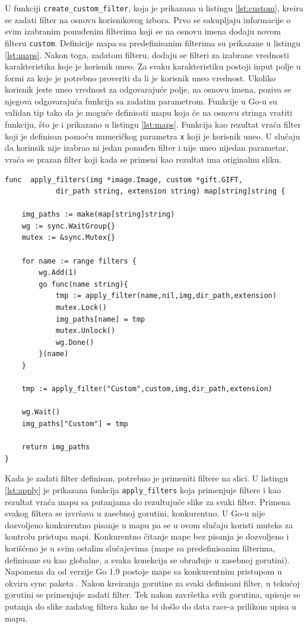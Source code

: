 \documentclass[12pt,oneside]{memoir}
\begin{document}
 U funkciji  \texttt{create\_custom\_filter}, koja je prikazana u listingu \ref{lst:custom}, kreira se zadati filter na osnovu korisnikovog izbora. Prvo se sakupljaju informacije o svim izabranim ponuđenim filterima koji se na osnovu imena dodaju novom filteru  \texttt{custom}. Definicije mapa sa predefinisanim filterima su prikazane u listingu \ref{lst:maps}. Nakon toga, zadatom filteru, dodaju se filteri za izabrane vrednosti karakteristika koje je korisnik uneo. Za svaku karakteristiku postoji input polje u formi za koje je potrebno proveriti da li je korisnik uneo vrednost. Ukoliko korisnik jeste uneo vrednost za odgovarajuće polje, na osnovu imena, poziva se njegova odgovarajuća funkcija sa zadatim parametrom. Funkcije u Go-u su validan tip tako da je moguće definisati mapu koja će na osnovu stringa vratiti funkciju, što je i prikazano u listingu \ref{lst:maps}. Funkcija kao rezultat vraća filter koji je definisan pomoću numeričkog parametra  \texttt{x} koji je korisnik uneo. U slučaju da korinsik nije izabrao ni jedan ponuđen filter i nije uneo nijedan parametar, vraća se prazan filter koji kada se primeni kao rezultat ima originalnu sliku.

\begin{center}
\begin{lstlisting}[caption=Funkcija za paralelnu primenu filtera,label={lst:apply},  backgroundcolor=\color{background}]
func  apply_filters(img *image.Image, custom *gift.GIFT, 
			dir_path string, extension string) map[string]string {

	img_paths := make(map[string]string)
	wg := sync.WaitGroup{}
	mutex := &sync.Mutex{}

	for name := range filters {
		wg.Add(1)
		go func(name string){
			tmp := apply_filter(name,nil,img,dir_path,extension)
			mutex.Lock()
			img_paths[name] = tmp
			mutex.Unlock()
			wg.Done()
		}(name)
	}

	tmp := apply_filter("Custom",custom,img,dir_path,extension)

	wg.Wait()
	img_paths["Custom"] = tmp

	return img_paths
}
\end{lstlisting}
\end{center}

Kada je zadati filter definisan, potrebno je primeniti filtere na slici. U listingu \ref{lst:apply} je prikazana funkcija  \texttt{apply\_filters} koja primenjuje filtere i kao rezultat vraća mapu sa putanjama do rezultujuće slike za svaki filter. Primena svakog filtera se izvršava u zasebnoj gorutini, konkurentno. U Go-u nije dozvoljeno konkurentno pisanje u mapu pa se u ovom slučaju koristi muteks za kontrolu pristupa mapi. Konkurentno čitanje mape bez pisanja je dozvoljeno i korišćeno je u svim ostalim slučajevima (mape sa predefinisanim filterima, definisane su kao globalne, a svaka konekcija se obrađuje u zasebnoj gorutini). Napomena da od verzije Go 1.9 postoje mape sa konkurentnim pristupom u okviru sync paketa \cite{sync}. Nakon kreiranja gorutine za svaki definisani filter, u tekućoj gorutini se primenjuje zadati filter. Tek nakon završetka svih gorutina, upisuje se putanja do slike zadatog filtera kako ne bi došlo do data race-a prilikom upisa u mapu. 
\end{document}
